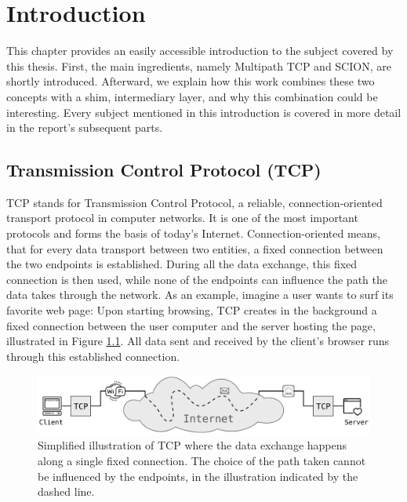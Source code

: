 \newcommand{\package}{\emph}

\chapter{Introduction}
\label{chap:Introduction}

This chapter provides an easily accessible introduction to the subject covered by this thesis.  First, the main ingredients, namely Multipath TCP and SCION, are shortly introduced. Afterward, we explain how this work combines these two concepts with a shim, intermediary layer, and why this combination could be interesting. Every subject mentioned in this introduction is covered in more detail in the report's subsequent parts.

\section{Transmission Control Protocol (TCP)}

TCP stands for Transmission Control Protocol, a reliable, connection-oriented transport protocol in computer networks. It is one of the most important protocols and forms the basis of today's Internet. Connection-oriented means, that for every data transport between two entities, a fixed connection between the two endpoints is established. During all the data exchange, this fixed connection is then used, while none of the endpoints can influence the path the data takes through the network. As an example, imagine a user wants to surf its favorite web page: Upon starting browsing, TCP creates in the background a fixed connection between the user computer and the server hosting the page, illustrated in Figure \ref{fig:IntroTCP}. All data sent and received by the client's browser runs through this established connection.

\newpage

\begin{figure}[H]
	\begin{center}
		\def\svgwidth{1\textwidth}
		\includegraphics[scale=0.28]{../illustrations/introduction/TCPConnection.pdf}  
		\caption[Caption for the list of figures.]{Simplified illustration of TCP where the data exchange happens along a single fixed connection. The choice of the path taken cannot be influenced by the endpoints, in the illustration indicated by the dashed line.}
		\label{fig:IntroTCP}
	\end{center}
\end{figure}

